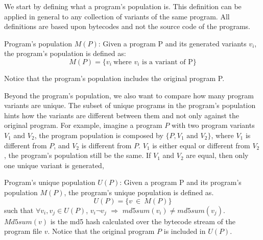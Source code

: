 We start by defining what a program's population is. This definition can be applied in general to any collection of variants of the same program. All definitions are based upon bytecodes and not the source code of the programs.

\begin{definition}{Program's population $M(P)$:}\label{def:rq1:programspopulation}
    \normalfont 
    Given a program P and its generated variants $v_i$, the program's population is defined as:\\
    $$
        M(P)=\{v_i\ \text{where $v_i$ is a variant of P}\}
    $$

    Notice that the program's population includes the original program P.
\end{definition}

Beyond the program's population, we also want to compare how many program variants are unique. The subset of unique programs in the program's population hints how the variants are different between them and not only against the original program. For example, imagine a program $P$ with two program variants $V_1$ and $V_2$, the program population is composed by $\{P, V_1 \text{ and } V_2\}$, where $V_1$ is different from $P$, and $V_2$ is different from $P$. $V_1$ is either equal or different from $V_2$, the program's population still be the same. If $V_1$ and $V_2$ are equal, then only one unique variant is generated,






\begin{definition}{Program's unique population $U(P)$:}\label{def:rq1:programsuniquepopulation}
    \normalfont 
    Given a program P and its program's population $M(P)$, the program's unique population is defined as.\\
    $$
        U(P)=\{v\ \in\ M(P)\}
    $$
    such that $\forall v_i,v_j \in U(P)$, $v_i \neg v_j$ $\Rightarrow$ $md5sum(v_i) \ne md5sum(v_j)$.
    $Md5sum(v)$ is the md5 hash calculated over the bytecode stream of the program file $v$. Notice that the original program $P$ is included in $U(P)$.

\end{definition}

